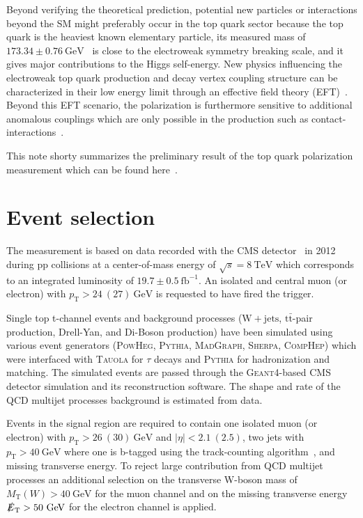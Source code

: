 \documentclass[a4paper]{jpconf}
\newcommand{\unit}[1]{\ensuremath{\mathrm{~#1}}}
\newcommand{\wjets}[0]{\mathrm{W+jets}}
\newcommand{\ttbar}[0]{\ensuremath{\mathrm{t\bar{t}}}}
\newcommand{\pT}[0]{\ensuremath{p_\mathrm{T}}}
\newcommand{\mtw}[0]{\ensuremath{M_\mathrm{T}(W)}}
\newcommand{\met}[0]{\ensuremath{\slashed E_\mathrm{T}}}
\begin{document}
Beyond verifying the theoretical prediction, potential new particles or interactions beyond the SM might preferably occur in the top quark sector because the top quark is the heaviest known elementary particle, its measured mass of $173.34\pm 0.76\unit{GeV}$~\cite{topmass} is close to the electroweak symmetry breaking scale, and it gives major contributions to the Higgs self-energy. New physics influencing the electroweak top quark production and decay vertex coupling structure can be characterized in their low energy limit through an effective field theory (EFT)~\cite{jaaswpol}. Beyond this EFT scenario, the polarization is furthermore sensitive to additional anomalous couplings which are only possible in the production such as contact-interactions~\cite{fabian}.


This note shorty summarizes the preliminary result of the top quark polarization measurement which can be found here~\cite{stpol}.

\section{Event selection}
The measurement is based on data recorded with the CMS detector~\cite{cms} in 2012 during pp collisions at a center-of-mass energy of $\sqrt{s}=8\unit{TeV}$ which corresponds to an integrated luminosity of $19.7\pm0.5\unit{fb^{-1}}$. An isolated and central muon (or electron) with $\pT>24~(27)\unit{GeV}$ is requested to have fired the trigger.


Single top t-channel events and background processes ($\wjets$, $\ttbar$-pair production, Drell-Yan, and Di-Boson production) have been simulated using various event generators (\textsc{PowHeg}, \textsc{Pythia}, \textsc{MadGraph}, \textsc{Sherpa}, \textsc{CompHep}) which were interfaced with \textsc{Tauola} for $\tau$ decays and \textsc{Pythia} for hadronization and matching. The simulated events are passed through the \textsc{Geant4}-based CMS detector simulation and its reconstruction software. The shape and rate of the QCD multijet processes background is estimated from data.


Events in the signal region are required to contain one isolated muon (or electron) with $\pT>26~(30)\unit{GeV}$ and $|\eta|<2.1~(2.5)$, two jets with $\pT>40\unit{GeV}$ where one is b-tagged using the track-counting algorithm~\cite{tc}, and missing transverse energy. To reject large contribution from QCD multijet processes an additional selection on the transverse W-boson mass of $\mtw>40\unit{GeV}$ for the muon channel and on the missing transverse energy $\met>50\unit{GeV}$ for the electron channel is applied. 
\end{document}
